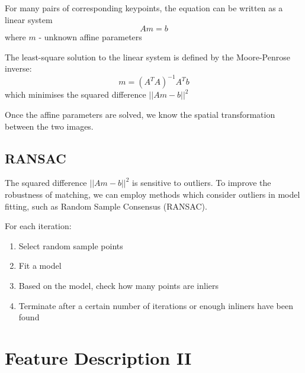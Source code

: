 \documentclass{report}
\begin{document}
For many pairs of corresponding keypoints, the equation can be written as a
linear system
$$
    Am = b
$$
where $m$ - unknown affine parameters 

The least-square solution to the linear system is defined by the Moore-Penrose inverse:
$$
    m = (A^T A)^{-1} A^T b
$$
which minimises the squared difference $||Am - b||^2$

Once the affine parameters are solved, we know the spatial transformation between the two images.

\section{RANSAC}

The squared difference $||Am - b||^2$ is sensitive to outliers. To improve the robustness of matching, we can
employ methods which consider outliers in model fitting, such as Random Sample
Consensus (RANSAC).

For each iteration:
\begin{enumerate}
    \item Select random sample points 
    \item Fit a model 
    \item Based on the model, check how many points are inliers 
    \item Terminate after a certain number of iterations or enough inliners have been
    found 
\end{enumerate}

\chapter{Feature Description II}
\end{document}
